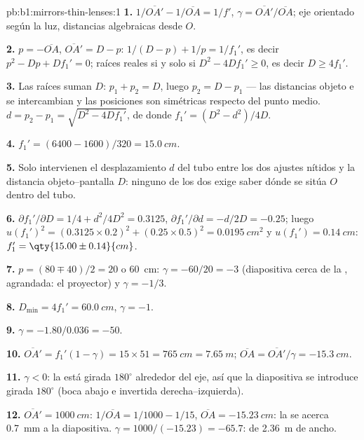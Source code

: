 \begin{solution}{pb:b1:mirrors-thin-lenses:1}
\textbf{1.} $1/\overline{OA'} - 1/\overline{OA} = 1/f'$,
$\gamma = \overline{OA'}/\overline{OA}$; eje orientado según la luz,
distancias algebraicas desde $O$.

\textbf{2.} $p = -\overline{OA}$, $\overline{OA'} = D - p$:
$1/(D - p) + 1/p = 1/f_1'$, es decir $p^2 - Dp + Df_1' = 0$; raíces reales
si y solo si $D^2 - 4Df_1' \geq 0$, es decir $D \geq 4f_1'$.

\textbf{3.} Las raíces suman $D$: $p_1 + p_2 = D$, luego $p_2 = D - p_1$ ---
las distancias objeto e  se intercambian y las posiciones son
simétricas respecto del punto medio. $d = p_2 - p_1 = \sqrt{D^2 - 4Df_1'}$,
de donde $f_1' = (D^2 -
d^2)/4D$.

\textbf{4.} $f_1' = (6400 - 1600)/320 = \qty{15.0}{cm}$.

\textbf{5.} Solo intervienen el desplazamiento $d$ del tubo entre los dos
ajustes nítidos y la distancia objeto--pantalla $D$: ninguno de los dos
exige saber dónde se sitúa $O$ dentro del tubo.

\textbf{6.} $\partial f_1'/\partial D = 1/4 + d^2/4D^2 = 0.3125$,
$\partial f_1'/\partial d = -d/2D = -0.25$; luego
$u(f_1')^2 = (0.3125 \times 0.2)^2 + (0.25 \times 0.5)^2 =
\qty{0.0195}{cm^2}$ y $u(f_1') = \qty{0.14}{cm}$:
$f_1' = \qty{15.00\pm0.14}{cm}$.

\textbf{7.} $p = (80 \mp 40)/2 = 20$ o \qty{60}{cm}: $\gamma =
-60/20 = -3$ (diapositiva cerca de la , agrandada: el proyector) y
$\gamma = -1/3$.

\textbf{8.} $D_{\min} = 4f_1' = \qty{60.0}{cm}$, $\gamma = -1$.

\textbf{9.} $\gamma = -1.80/0.036 = -50$.

\textbf{10.} $\overline{OA'} = f_1'(1 - \gamma) = 15 \times 51 =
\qty{765}{cm} = \qty{7.65}{m}$; $\overline{OA} = \overline{OA'}/\gamma =
\qty{-15.3}{cm}$.

\textbf{11.} $\gamma < 0$: la  está girada $180^\circ$
alrededor del eje, así que la diapositiva se introduce girada $180^\circ$
(boca abajo e invertida derecha--izquierda).

\textbf{12.} $\overline{OA'} = \qty{1000}{cm}$: $1/\overline{OA} = 1/1000
- 1/15$, $\overline{OA} = \qty{-15.23}{cm}$: la  se acerca \qty{0.7}{mm}
a la diapositiva. $\gamma = 1000/(-15.23) = -65.7$:  de
\qty{2.36}{m} de ancho.


\end{solution}
